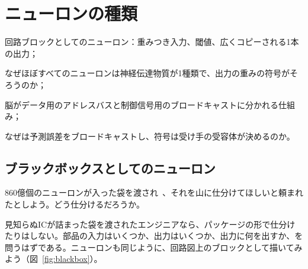 \chapter{ニューロンの種類}
\label{sec:neurontypes}
\begin{chaptergoals}
\item 回路ブロックとしてのニューロン：重みつき入力、閾値、広くコピーされる1本の出力；
\item なぜほぼすべてのニューロンは神経伝達物質が1種類で、出力の重みの符号がそろうのか；
\item 脳がデータ用のアドレスバスと制御信号用のブロードキャストに分かれる仕組み；
\item なぜは予測誤差をブロードキャストし、符号は受け手の受容体が決めるのか。
\end{chaptergoals}

\section{ブラックボックスとしてのニューロン}

860億個のニューロンが入った袋を渡され~\cite{Azevedo2009}、それを山に仕分けてほしいと頼まれたとしよう。どう仕分けるだろうか。

見知らぬICが詰まった袋を渡されたエンジニアなら、パッケージの形で仕分けたりはしない。部品の入力はいくつか、出力はいくつか、出力に何を出すか、を問うはずである。ニューロンも同じように、回路図上のブロックとして描いてみよう（図~\ref{fig:blackbox}）。

